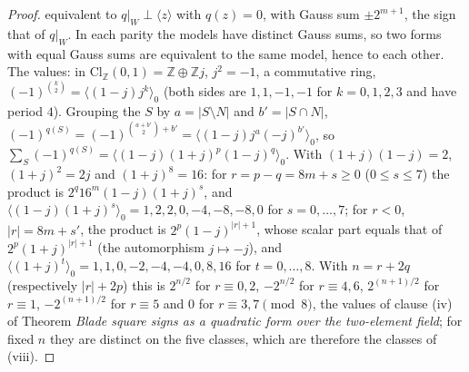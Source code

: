 \documentclass[11pt]{article}
\theoremstyle{definition}
\theoremstyle{plain}
\providecommand{\Cl}{}\renewcommand{\Cl}{\mathrm{Cl}}
\providecommand{\Z}{}\renewcommand{\Z}{\mathbb{Z}}
\begin{document}
\begin{proof}
equivalent to $q|_{W} \perp \langle z\rangle$ with $q(z) = 0$, with Gauss sum $\pm 2^{m+1}$, the sign that of $q|_{W}$. In each parity the models have distinct Gauss sums, so two forms with equal Gauss sums are equivalent to the same model, hence to each other. The values: in $\Cl_{\Z}(0,1) = \Z \oplus \Z j$, $j^{2} = -1$, a commutative ring, $(-1)^{\binom{k}{2}} = \langle (1 - j)j^{k}\rangle_{0}$ (both sides are $1, 1, -1, -1$ for $k = 0, 1, 2, 3$ and have period $4$). Grouping the $S$ by $a = |S \setminus N|$ and $b' = |S \cap N|$, $(-1)^{q(S)} = (-1)^{\binom{a + b'}{2} + b'} = \langle (1 - j)j^{a}(-j)^{b'}\rangle_{0}$, so $\sum_{S}(-1)^{q(S)} = \langle (1 - j)(1 + j)^{p}(1 - j)^{q}\rangle_{0}$. With $(1 + j)(1 - j) = 2$, $(1 + j)^{2} = 2j$ and $(1 + j)^{8} = 16$: for $r = p - q = 8m + s \ge 0$ ($0 \le s \le 7$) the product is $2^{q}16^{m}(1 - j)(1 + j)^{s}$, and $\langle (1 - j)(1 + j)^{s}\rangle_{0} = 1, 2, 2, 0, -4, -8, -8, 0$ for $s = 0, \dots, 7$; for $r < 0$, $|r| = 8m + s'$, the product is $2^{p}(1 - j)^{|r| + 1}$, whose scalar part equals that of $2^{p}(1 + j)^{|r| + 1}$ (the automorphism $j \mapsto -j$), and $\langle (1 + j)^{t}\rangle_{0} = 1, 1, 0, -2, -4, -4, 0, 8, 16$ for $t = 0, \dots, 8$. With $n = r + 2q$ (respectively $|r| + 2p$) this is $2^{n/2}$ for $r \equiv 0, 2$, $-2^{n/2}$ for $r \equiv 4, 6$, $2^{(n+1)/2}$ for $r \equiv 1$, $-2^{(n+1)/2}$ for $r \equiv 5$ and $0$ for $r \equiv 3, 7 \pmod 8$, the values of clause (iv) of Theorem \emph{Blade square signs as a quadratic form over the two-element field}; for fixed $n$ they are distinct on the five classes, which are therefore the classes of (viii).


\end{proof}
\end{document}
